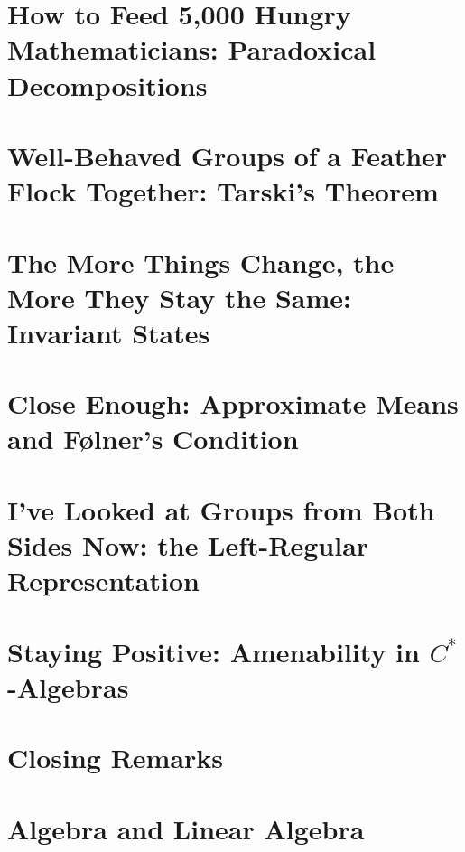 \documentclass[10pt]{package2}
\begin{document}
\chapter{How to Feed 5,000 Hungry Mathematicians: Paradoxical Decompositions}\label{ch:paradoxical_decompositions}

\chapter{Well-Behaved Groups of a Feather Flock Together: Tarski's Theorem}\label{ch:tarskis_theorem}

\chapter{The More Things Change, the More They Stay the Same: Invariant States}\label{ch:invariant_states}

\chapter{Close Enough: Approximate Means and Følner's Condition}\label{ch:folner_condition}

\chapter{I've Looked at Groups from Both Sides Now: the Left-Regular Representation}\label{ch:left_regular_representation}

\chapter{Staying Positive: Amenability in \texorpdfstring{$C^{\ast}$-Algebras}{C*-Algebras}}\label{ch:nuclearity}

\chapter{Closing Remarks}

\appendix
\chapter{Algebra and Linear Algebra}\label{ch:algebra_and_linear_algebra}

\end{document}
